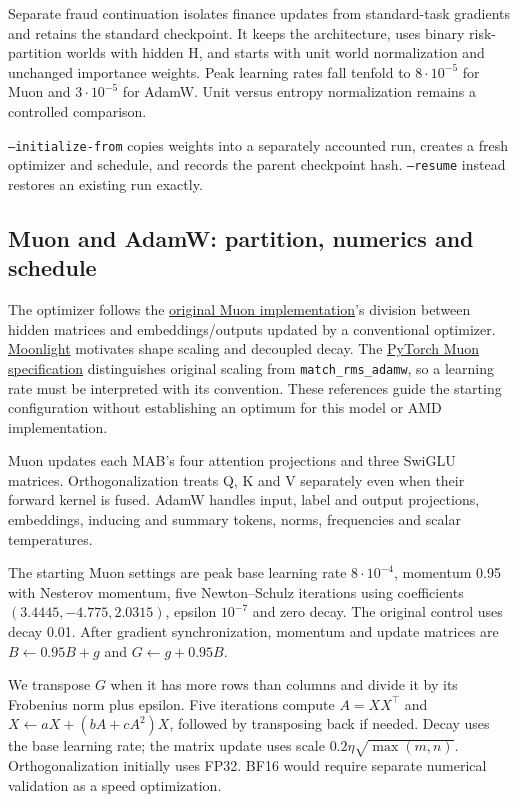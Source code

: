 \documentclass[11pt]{article}
\begin{document}
Separate fraud continuation isolates finance updates from standard-task gradients and retains the standard checkpoint. It keeps the architecture, uses binary risk-partition worlds with hidden H, and starts with unit world normalization and unchanged importance weights. Peak learning rates fall tenfold to $8\cdot10^{-5}$ for Muon and $3\cdot10^{-5}$ for AdamW. Unit versus entropy normalization remains a controlled comparison.

\texttt{--initialize-from} copies weights into a separately accounted run, creates a fresh optimizer and schedule, and records the parent checkpoint hash. \texttt{--resume} instead restores an existing run exactly.

\subsection{Muon and AdamW: partition, numerics and schedule}
\label{sec:optimizer}

The optimizer follows the \href{https://github.com/KellerJordan/Muon}{original Muon implementation}'s division between hidden matrices and embeddings/outputs updated by a conventional optimizer. \href{https://arxiv.org/abs/2502.16982}{Moonlight} motivates shape scaling and decoupled decay. The \href{https://docs.pytorch.org/docs/2.14/generated/torch.optim.Muon.html}{PyTorch Muon specification} distinguishes original scaling from \texttt{match\_rms\_adamw}, so a learning rate must be interpreted with its convention. These references guide the starting configuration without establishing an optimum for this model or AMD implementation.

Muon updates each MAB's four attention projections and three SwiGLU matrices. Orthogonalization treats Q, K and V separately even when their forward kernel is fused. AdamW handles input, label and output projections, embeddings, inducing and summary tokens, norms, frequencies and scalar temperatures.

The starting Muon settings are peak base learning rate $8\cdot10^{-4}$, momentum 0.95 with Nesterov momentum, five Newton--Schulz iterations using coefficients $(3.4445,-4.775,2.0315)$, epsilon $10^{-7}$ and zero decay. The original control uses decay 0.01. After gradient synchronization, momentum and update matrices are $B\leftarrow0.95B+g$ and $G\leftarrow g+0.95B$.

We transpose $G$ when it has more rows than columns and divide it by its Frobenius norm plus epsilon. Five iterations compute $A=XX^\top$ and $X\leftarrow aX+(bA+cA^2)X$, followed by transposing back if needed. Decay uses the base learning rate; the matrix update uses scale $0.2\eta\sqrt{\max(m,n)}$. Orthogonalization initially uses FP32. BF16 would require separate numerical validation as a speed optimization.
\end{document}
